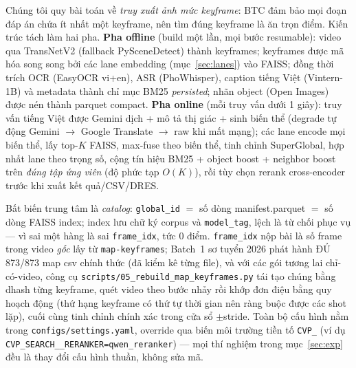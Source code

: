 \documentclass{ai_conquer2026}
\begin{document}
Chúng tôi quy bài toán về \emph{truy xuất ảnh mức keyframe}: BTC đảm bảo mọi đoạn đáp án
chứa ít nhất một keyframe, nên tìm đúng keyframe là ăn trọn điểm. Kiến trúc tách làm hai
pha. \textbf{Pha offline} (build một lần, mọi bước resumable): video qua TransNetV2 (fallback
PySceneDetect) thành keyframes; keyframes được mã hóa song song bởi các lane embedding
(mục~\ref{sec:lanes}) vào FAISS; đồng thời trích OCR (EasyOCR vi+en), ASR (PhoWhisper),
caption tiếng Việt (Vintern-1B) và metadata thành chỉ mục BM25 \emph{persisted}; nhãn object
(Open Images) được nén thành parquet compact. \textbf{Pha online} (mỗi truy vấn dưới 1 giây):
truy vấn tiếng Việt được Gemini dịch + mô tả thị giác + sinh biến thể (degrade tự động
Gemini $\rightarrow$ Google Translate $\rightarrow$ raw khi mất mạng); các lane encode mọi
biến thể, lấy top-$K$ FAISS, max-fuse theo biến thể, tinh chỉnh SuperGlobal, hợp nhất lane
theo trọng số, cộng tín hiệu BM25 + object boost + neighbor boost trên \emph{đúng tập ứng
viên} (độ phức tạp $O(K)$), rồi tùy chọn rerank cross-encoder trước khi xuất kết quả/CSV/DRES.

\begin{figure}[H]
  \centering
  \begin{figurecaptionmodern}
  \end{figurecaptionmodern}
\end{figure}

Bất biến trung tâm là \emph{catalog}: \texttt{global\_id} $=$ số dòng manifest.parquet $=$
số dòng FAISS index; index lưu chữ ký corpus và \texttt{model\_tag}, lệch là từ chối phục vụ
--- vì sai một hàng là sai \texttt{frame\_idx}, tức 0 điểm. \texttt{frame\_idx} nộp bài là số
frame trong video \emph{gốc} lấy từ \texttt{map-keyframes}; Batch~1 sơ tuyển 2026 phát
hành ĐỦ 873/873 map csv chính thức (đã kiểm kê từng file), và với các gói tương lai
chỉ-có-video, công cụ
\texttt{scripts/05\_rebuild\_map\_keyframes.py} tái tạo chúng bằng dhash từng keyframe, quét
video theo bước nhảy rồi khớp đơn điệu bằng quy hoạch động (thứ hạng keyframe có thứ tự thời
gian nên ràng buộc được các shot lặp), cuối cùng tinh chỉnh chính xác trong cửa sổ
$\pm$stride. Toàn bộ cấu hình nằm trong \texttt{configs/settings.yaml}, override qua biến
môi trường tiền tố \texttt{CVP\_} (ví dụ \texttt{CVP\_SEARCH\_\_RERANKER=qwen\_reranker}) ---
mọi thí nghiệm trong mục~\ref{sec:exp} đều là thay đổi cấu hình thuần, không sửa mã.
\end{document}
